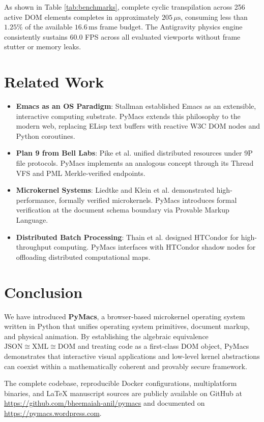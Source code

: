 \documentclass[10pt,twocolumn,letterpaper]{article}
\begin{document}
As shown in Table \ref{tab:benchmarks}, complete cyclic transpilation across 256 active DOM elements completes in approximately $205\,\mu\text{s}$, consuming less than $1.25\%$ of the available $16.6\,\mathrm{ms}$ frame budget. The Antigravity physics engine consistently sustains 60.0 FPS across all evaluated viewports without frame stutter or memory leaks.

\section{Related Work}
\begin{itemize}
    \item \textbf{Emacs as an OS Paradigm}: Stallman \cite{stallman1981emacs} established Emacs as an extensible, interactive computing substrate. PyMacs extends this philosophy to the modern web, replacing ELisp text buffers with reactive W3C DOM nodes and Python coroutines.
    \item \textbf{Plan 9 from Bell Labs}: Pike et al. \cite{pike1995plan9} unified distributed resources under 9P file protocols. PyMacs implements an analogous concept through its Thread VFS and PML Merkle-verified endpoints.
    \item \textbf{Microkernel Systems}: Liedtke \cite{liedtke1995microkernel} and Klein et al. \cite{klein2009sel4} demonstrated high-performance, formally verified microkernels. PyMacs introduces formal verification at the document schema boundary via Provable Markup Language.
    \item \textbf{Distributed Batch Processing}: Thain et al. \cite{thain2005condor} designed HTCondor for high-throughput computing. PyMacs interfaces with HTCondor shadow nodes for offloading distributed computational maps.
\end{itemize}

\section{Conclusion}
We have introduced \textbf{PyMacs}, a browser-based microkernel operating system written in Python that unifies operating system primitives, document markup, and physical animation. By establishing the algebraic equivalence $\mathrm{JSON} \cong \mathrm{XML} \cong \mathrm{DOM}$ and treating code as a first-class DOM object, PyMacs demonstrates that interactive visual applications and low-level kernel abstractions can coexist within a mathematically coherent and provably secure framework. 

The complete codebase, reproducible Docker configurations, multiplatform binaries, and LaTeX manuscript sources are publicly available on GitHub at \url{https://github.com/bheemaiah-anil/pymacs} and documented on \url{https://pymacs.wordpress.com}.



\end{document}
